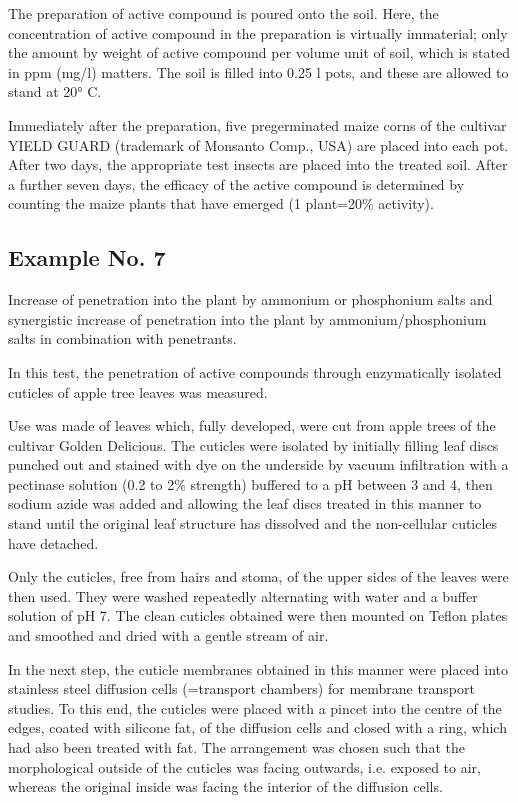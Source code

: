 \documentclass[11pt,a4paper]{article}
\begin{document}
The preparation of active compound is poured onto the soil. Here, the concentration of active compound in the preparation is virtually immaterial; only the amount by weight of active compound per volume unit of soil, which is stated in ppm (mg/l) matters. The soil is filled into 0.25 l pots, and these are allowed to stand at 20° C.

Immediately after the preparation, five pregerminated maize corns of the cultivar YIELD GUARD (trademark of Monsanto Comp., USA) are placed into each pot. After two days, the appropriate test insects are placed into the treated soil. After a further seven days, the efficacy of the active compound is determined by counting the maize plants that have emerged (1 plant=20\% activity).

\subsection{Example No. 7}

Increase of penetration into the plant by ammonium or phosphonium salts and synergistic increase of penetration into the plant by ammonium/phosphonium salts in combination with penetrants.

In this test, the penetration of active compounds through enzymatically isolated cuticles of apple tree leaves was measured.

Use was made of leaves which, fully developed, were cut from apple trees of the cultivar Golden Delicious. The cuticles were isolated by initially filling leaf discs punched out and stained with dye on the underside by vacuum infiltration with a pectinase solution (0.2 to 2\% strength) buffered to a pH between 3 and 4, then sodium azide was added and allowing the leaf discs treated in this manner to stand until the original leaf structure has dissolved and the non-cellular cuticles have detached.

Only the cuticles, free from hairs and stoma, of the upper sides of the leaves were then used. They were washed repeatedly alternating with water and a buffer solution of pH 7. The clean cuticles obtained were then mounted on Teflon plates and smoothed and dried with a gentle stream of air.

In the next step, the cuticle membranes obtained in this manner were placed into stainless steel diffusion cells (=transport chambers) for membrane transport studies. To this end, the cuticles were placed with a pincet into the centre of the edges, coated with silicone fat, of the diffusion cells and closed with a ring, which had also been treated with fat. The arrangement was chosen such that the morphological outside of the cuticles was facing outwards, i.e. exposed to air, whereas the original inside was facing the interior of the diffusion cells.
\end{document}
